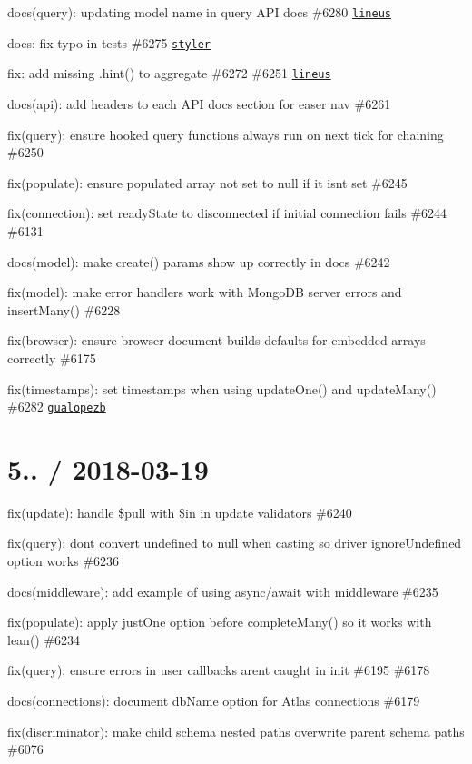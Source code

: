 \begin{DoxyItemize}
\item docs(query)\+: updating model name in query A\+PI docs \#6280 \href{https://github.com/lineus}{\tt lineus}
\item docs\+: fix typo in tests \#6275 \href{https://github.com/styler}{\tt styler}
\item fix\+: add missing {\ttfamily .hint()} to aggregate \#6272 \#6251 \href{https://github.com/lineus}{\tt lineus}
\item docs(api)\+: add headers to each A\+PI docs section for easer nav \#6261
\item fix(query)\+: ensure hooked query functions always run on next tick for chaining \#6250
\item fix(populate)\+: ensure populated array not set to null if it isn\textquotesingle{}t set \#6245
\item fix(connection)\+: set ready\+State to disconnected if initial connection fails \#6244 \#6131
\item docs(model)\+: make {\ttfamily create()} params show up correctly in docs \#6242
\item fix(model)\+: make error handlers work with Mongo\+DB server errors and {\ttfamily insert\+Many()} \#6228
\item fix(browser)\+: ensure browser document builds defaults for embedded arrays correctly \#6175
\item fix(timestamps)\+: set timestamps when using {\ttfamily update\+One()} and {\ttfamily update\+Many()} \#6282 \href{https://github.com/gualopezb}{\tt gualopezb}
\end{DoxyItemize}

\section*{5.. / 2018-\/03-\/19 }


\begin{DoxyItemize}
\item fix(update)\+: handle \$pull with \$in in update validators \#6240
\item fix(query)\+: don\textquotesingle{}t convert undefined to null when casting so driver {\ttfamily ignore\+Undefined} option works \#6236
\item docs(middleware)\+: add example of using async/await with middleware \#6235
\item fix(populate)\+: apply just\+One option before {\ttfamily complete\+Many()} so it works with lean() \#6234
\item fix(query)\+: ensure errors in user callbacks aren\textquotesingle{}t caught in init \#6195 \#6178
\item docs(connections)\+: document db\+Name option for Atlas connections \#6179
\item fix(discriminator)\+: make child schema nested paths overwrite parent schema paths \#6076
\end{DoxyItemize}

